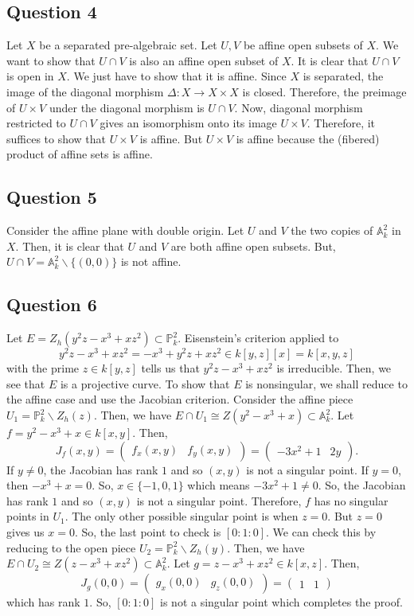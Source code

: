 \documentclass{article}
\newcommand{\PP}{\mathbb{P}}
\newcommand{\A}{\mathbb{A}}
\begin{document}
\subsection*{Question 4}
Let $X$ be a separated pre-algebraic set. Let $U,V$ be affine open subsets of $X$. 
We want to show that $U \cap V$ is also an affine open subset of $X$. 
It is clear that $U \cap V$ is open in $X$. We just have to show that it is affine. 
Since $X$ is separated, the image of the diagonal morphism $\Delta: X \to X \times X$ is closed. 
Therefore, the preimage of $U \times V$ under the diagonal morphism is $U \cap V$. 
Now, diagonal morphism restricted to $U \cap V$ gives an isomorphism onto its image $U \times V$. 
Therefore, it suffices to show that $U \times V$ is affine. But $U \times V$ is affine 
because the (fibered) product of affine sets is affine. 

\subsection*{Question 5}
Consider the affine plane with double origin. Let $U$ and $V$ the two copies of $\A^2_k$ in $X$. 
Then, it is clear that $U$ and $V$ are both affine open subsets. 
But, $U \cap V = \A^2_k \backslash \{(0,0)\}$ is not affine. 
 
\subsection*{Question 6}
Let $E=Z_h(y^2z-x^3+xz^2) \subset \PP^2_k$. 
Eisenstein's criterion applied to $$y^2z-x^3+xz^2 = -x^3+y^2z+xz^2 \in k[y,z][x] = k[x,y,z]$$ 
with the prime $z\in k[y,z]$ tells us that $y^2z-x^3+xz^2$ is irreducible. 
Then, we see that $E$ is a projective curve. To show that $E$ is nonsingular, 
we shall reduce to the affine case and use the Jacobian criterion. 
Consider the affine piece $U_1 = \PP^2_k \backslash Z_h(z)$. Then, we have 
$E \cap U_1 \cong Z(y^2-x^3+x) \subset \A^2_k$. Let $f = y^2-x^3+x \in k[x,y]$. Then, 
$$
J_f(x,y) 
= 
\begin{pmatrix}
    f_x(x,y)
    &f_y(x,y)
\end{pmatrix}
= 
\begin{pmatrix}
    -3x^2+1
    &2y 
\end{pmatrix}.
$$
If $y \neq 0$, the Jacobian has rank $1$ and so $(x,y)$ is not a singular point. 
If $y = 0$, then $-x^3+x=0$. So, $x\in \{-1,0,1\}$ which means $-3x^2+1\neq 0$. 
So, the Jacobian has rank $1$ and so $(x,y)$ is not a singular point. 
Therefore, $f$ has no singular points in $U_1$. The only other possible singular point is 
when $z=0$. But $z=0$ gives us $x=0$. So, the last point to check is $[0:1:0]$. 
We can check this by reducing to the open piece $U_2 = \PP^2_k \backslash Z_h(y)$. 
Then, we have 
$E \cap U_2 \cong Z(z-x^3+xz^2) \subset \A^2_k$. Let $g = z-x^3+xz^2 \in k[x,z]$. Then, 
$$
J_g(0,0) 
= 
\begin{pmatrix}
    g_x(0,0)
    &g_z(0,0)
\end{pmatrix}
= 
\begin{pmatrix}
    1
    &1 
\end{pmatrix}
$$ which has rank $1$. So, $[0:1:0]$ is not a singular point which completes the proof. 
\end{document}
